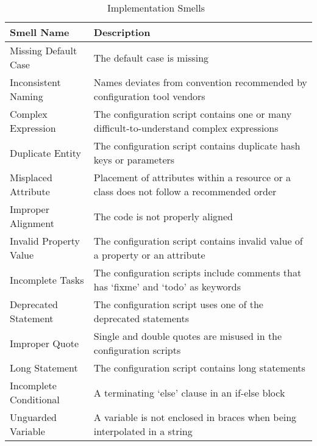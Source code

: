 \documentclass[smallextended]{svjour3}       %
\begin{document}
\begin{table}[]
\footnotesize
\captionsetup{justification=centering}
\caption{Implementation Smells~\citep{SharmaPuppet2016}}
\centering
\label{table:meth:pred:smells}
\begin{tabular}{p{3cm}p{8cm}}
\hline
\textbf{Smell Name}    & \textbf{Description}  \\
\hline
Missing Default Case   & The default case is missing \\
Inconsistent Naming    & Names deviates from convention recommended by configuration tool vendors \\
Complex Expression     &  The configuration script contains one or many difficult-to-understand complex expressions \\
Duplicate Entity       & The configuration script contains duplicate hash keys or parameters \\
Misplaced Attribute    & Placement of attributes within a resource or a class does not follow a recommended order \\
Improper Alignment     & The code is not properly aligned \\
Invalid Property Value & The configuration script contains invalid value of a property or an attribute \\
Incomplete Tasks       & The configuration scripts include comments that has `fixme' and `todo' as keywords \\
Deprecated Statement   & The configuration script uses one of the deprecated statements \\ 
Improper Quote         & Single and double quotes are misused in the configuration scripts \\
Long Statement         & The configuration script contains long statements\\
Incomplete Conditional & A terminating `else' clause in an if-else block\\
Unguarded Variable     & A variable is not enclosed in braces when being interpolated in a string \\
\hline
\end{tabular}
\end{table} 

\end{document}
